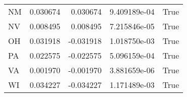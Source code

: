 \begin{table}
\begin{tabular}{lrrrl}
      NM &   0.030674 &  0.030674 &   9.409189e-04 &          True \\
      NV &   0.008495 &  0.008495 &   7.215846e-05 &          True \\
      OH &   0.031918 & -0.031918 &   1.018750e-03 &          True \\
      PA &   0.022575 & -0.022575 &   5.096159e-04 &          True \\
      VA &   0.001970 & -0.001970 &   3.881659e-06 &          True \\
      WI &   0.034227 & -0.034227 &   1.171489e-03 &          True \\
\bottomrule
\end{tabular}
\end{table}
